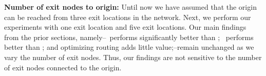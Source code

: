 


\textbf{Number of exit nodes to origin:}  Until now we have assumed that the origin can be reached from three exit locations in the network.  Next, we perform our experiments with one exit location and five exit locations. Our main findings from the prior sections, namely--\invlru\ performs significantly better than \optrp; \optrpfuture\ performs better than  \invlru; and optimizing routing adds little value;--remain unchanged as we vary the number of exit nodes. Thus, our findings are not sensitive to the number of exit nodes connected to the origin.



